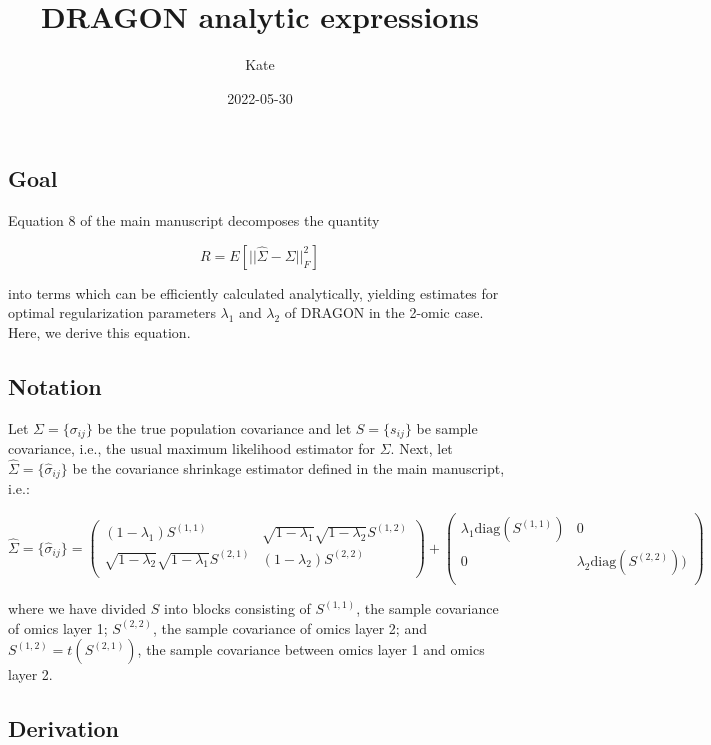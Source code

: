 \documentclass[
]{article}
\title{DRAGON analytic expressions}
\author{Kate}
\date{2022-05-30}
\begin{document}
\maketitle

\hypertarget{goal}{%
\subsection{Goal}\label{goal}}

Equation 8 of the main manuscript decomposes the quantity

\[
R = E\left[||\hat\Sigma - \Sigma||^2_F\right]
\]

into terms which can be efficiently calculated analytically, yielding
estimates for optimal regularization parameters \(\lambda_1\) and
\(\lambda_2\) of DRAGON in the 2-omic case. Here, we derive this
equation.

\hypertarget{notation}{%
\subsection{Notation}\label{notation}}

Let \(\Sigma = \{\sigma_{ij}\}\) be the true population covariance and
let \(S = \{s_{ij}\}\) be sample covariance, i.e., the usual maximum
likelihood estimator for \(\Sigma\). Next, let
\(\hat\Sigma = \{\hat{\sigma}_{ij}\}\) be the covariance shrinkage
estimator defined in the main manuscript, i.e.:

\[
\hat\Sigma = \{\hat\sigma_{ij}\} = \left(\begin{matrix}
(1-\lambda_1)S^{(1,1)} & \sqrt{1-\lambda_1}\sqrt{1-\lambda_2}S^{(1,2)} \\
\sqrt{1-\lambda_2}\sqrt{1-\lambda_1}S^{(2,1)} & (1-\lambda_2)S^{(2,2)} \\
\end{matrix}
\right) + \left(\begin{matrix} 
\lambda_1 \text{diag}(S^{(1,1)}) & 0 \\ 
0 & \lambda_2 \text{diag}(S^{(2,2)})) \\
\end{matrix}\right)
\]

where we have divided \(S\) into blocks consisting of \(S^{(1,1)}\), the
sample covariance of omics layer 1; \(S^{(2,2)}\), the sample covariance
of omics layer 2; and \(S^{(1,2)} = t(S^{(2,1)})\), the sample
covariance between omics layer 1 and omics layer 2.

\hypertarget{derivation}{%
\subsection{Derivation}\label{derivation}}
\end{document}
